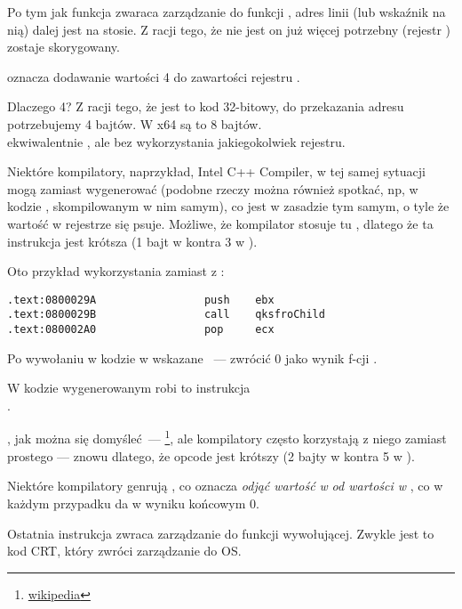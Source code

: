 Po tym jak funkcja \printf zwaraca zarządzanie do funkcji \main, adres linii (lub wskaźnik na nią) dalej jest na stosie.
Z racji tego, że nie jest on już więcej potrzebny  (rejestr \ESP) zostaje skorygowany.

 oznacza dodawanie wartości 4 do zawartości rejestru \ESP.

Dlaczego 4? Z racji tego, że jest to kod 32-bitowy, do przekazania adresu potrzebujemy 4 bajtów. W x64 są to 8 bajtów.\\
 ekwiwalentnie , ale bez wykorzystania jakiegokolwiek rejestru.

\myindex{\oracle}

Niektóre kompilatory, naprzykład, Intel C++ Compiler, w tej samej sytuacji mogą zamiast 
\ADD wygenerować  (podobne rzeczy można również spotkać, np, w kodzie \oracle{}, skompilowanym w nim samym),
co jest w zasadzie tym samym, o tyle że wartość w rejestrze \ECX się psuje.
Możliwe, że kompilator stosuje tu , dlatego że ta instrukcja jest krótsza (1 bajt w  kontra 3 w ).

Oto przykład wykorzystania \POP zamiast \ADD z \oracle{}:

\begin{lstlisting}[caption=\oracle 10.2 Linux (plik app.o),style=customasmx86]
.text:0800029A                 push    ebx
.text:0800029B                 call    qksfroChild
.text:080002A0                 pop     ecx
\end{lstlisting}

Po wywołaniu \printf w kodzie w \CCpp wskazane ~--- zwrócić 0 jako wynik f-cji \main.

W kodzie wygenerowanym robi to instrukcja \\
.


\XOR, jak można się domyśleć~--- \footnote{\href{http://go.yurichev.com/17118}{wikipedia}}, ale kompilatory często korzystają z niego zamiast prostego
 --- znowu dlatego, że opcode jest krótszy (2 bajty w \XOR kontra 5 w \MOV).

Niektóre kompilatory genrują , co oznacza \emph{odjąć wartość w} \EAX \emph{od wartości w }\EAX, co w każdym przypadku da w wyniku końcowym 0.

Ostatnia instrukcja \RET zwraca zarządzanie do funkcji wywołującej. Zwykle jest to kod \CCpp \ac{CRT}, który zwróci zarządzanie do \ac{OS}.


